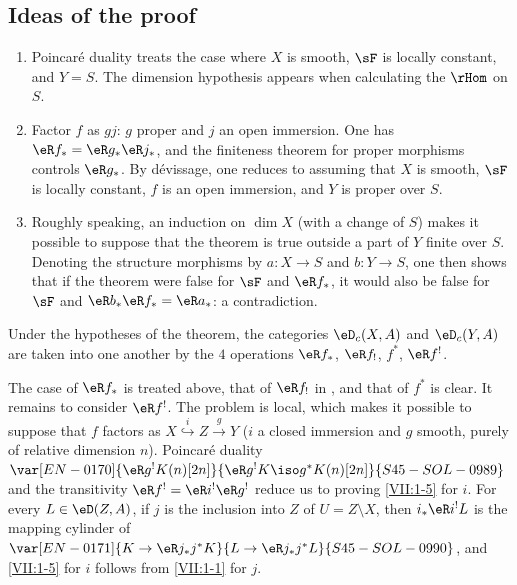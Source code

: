 \subsection{Ideas of the proof}\label{VII:1-4}
\begin{enumerate}[\indent a)]
  \item Poincaré duality treats the case where $X$ is smooth, $\sF$ is
    locally constant, and $Y=S$. The dimension hypothesis appears when calculating the $\rHom$ on $S$.
  \item Factor $f$ as $g j$: $g$ proper and $j$ an open immersion. One has
    $\eR f_\ast = \eR g_\ast \eR j_\ast$, and the finiteness theorem for
    proper morphisms controls $\eR g_\ast$. By dévissage, one reduces to
    assuming that $X$ is smooth, $\sF$ is locally constant, $f$ is an open
    immersion, and $Y$ is proper over $S$.
  \item Roughly speaking, an induction on $\dim X$ (with a change of $S$) makes it
    possible to suppose that the theorem is true outside a part of $Y$ finite
    over $S$. Denoting the structure morphisms by $a:X\to S$ and $b:Y\to S$,
    one then shows that if the theorem were false for $\sF$ and
    $\eR f_\ast$, it would also be false for $\sF$ and
    $\eR b_\ast \eR f_\ast = \eR a_\ast$: a contradiction.
\end{enumerate}






\begin{corollary_}\label{VII:1-5}
Under the hypotheses of the theorem, the categories $\eD_c(X,A)$ and
$\eD_c(Y,A)$ are taken into one another by the $4$ operations
$\eR f_\ast$, $\eR f_!$, $f^\ast$, $\eR f^!$.
\end{corollary_}

The case of $\eR f_\ast$ is treated above, that of $\eR f_!$ in
, and that of $f^\ast$ is clear. It remains to consider
$\eR f^!$. The problem is local, which makes it possible to suppose that $f$
factors as $X\overset{i}{\hookrightarrow} Z \xrightarrow g Y$ ($i$ a closed immersion and
$g$ smooth, purely of relative dimension $n$). Poincaré duality
$\var[EN-0170]{\eR g^! K(n)[2 n]}{\eR g^! K \iso g^\ast K(n)[2 n]}{S45-SOL-0989}$ and the transitivity
$\eR f^! = \eR i^! \eR g^!$ reduce us to proving \ref{VII:1-5} for $i$.
For every $L\in \eD(Z,A)$, if $j$ is the inclusion into $Z$ of
$U=Z\setminus X$, then $i_\ast \eR i^! L$ is the mapping cylinder of
$\var[EN-0171]{K\to \eR j_\ast j^\ast K}{L\to \eR j_\ast j^\ast L}{S45-SOL-0990}$, and \ref{VII:1-5} for $i$ follows from
\ref{VII:1-1} for $j$.






